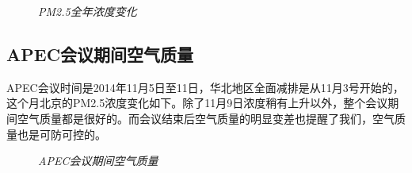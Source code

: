 ﻿\documentclass{article}
\begin{document}
\begin{CJK*}{GBK}{song}
\newpage

\begin{figure}[ht]
\centering
{}
\caption{\textit{PM2.5全年浓度变化}}
\end{figure}

\subsection{APEC会议期间空气质量}
\qquad APEC会议时间是2014年11月5日至11日，华北地区全面减排是从11月3号开始的，这个月北京的PM2.5浓度变化如下。除了11月9日浓度稍有上升以外，整个会议期间空气质量都是很好的。而会议结束后空气质量的明显变差也提醒了我们，空气质量也是可防可控的。

\begin{figure}[ht]
\centering
{}
\caption{\textit{APEC会议期间空气质量}}
\end{figure}


\end{CJK*}
\end{document}

